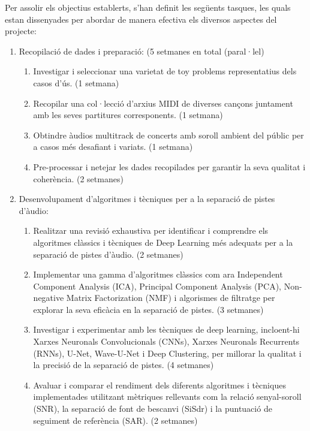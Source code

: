 ﻿\documentclass[10pt,a4paper,twocolumn,twoside]{article}
\begin{document}
Per assolir els objectius establerts, s'han definit les següents tasques, les quals estan dissenyades per abordar de manera efectiva els diversos aspectes del projecte:

\begin{enumerate}
    \item Recopilació de dades i preparació: (5 setmanes en total (paral·lel)
    \begin{enumerate}
        \item Investigar i seleccionar una varietat de toy problems representatius dels casos d'ús. (1 setmana)
        \item Recopilar una col·lecció d'arxius MIDI de diverses cançons juntament amb les seves partitures corresponents. (1 setmana)
        \item Obtindre àudios multitrack de concerts amb soroll ambient del públic per a casos més desafiant i variats. (1 setmana)
        \item Pre-processar i netejar les dades recopilades per garantir la seva qualitat i coherència. (2 setmanes)
    \end{enumerate}
    
    \item Desenvolupament d'algoritmes i tècniques per a la separació de pistes d'àudio:
    \begin{enumerate}
        \item Realitzar una revisió exhaustiva per identificar i comprendre els algoritmes clàssics i tècniques de Deep Learning més adequats per a la separació de pistes d'àudio. (2 setmanes)
        \item Implementar una gamma d'algoritmes clàssics com ara Independent Component Analysis (ICA), Principal Component Analysis (PCA), Non-negative Matrix Factorization (NMF) i algorismes de filtratge per explorar la seva eficàcia en la separació de pistes. (3 setmanes)
        \item Investigar i experimentar amb les tècniques de deep learning, incloent-hi Xarxes Neuronals Convolucionals (CNNs), Xarxes Neuronals Recurrents (RNNs), U-Net, Wave-U-Net i Deep Clustering, per millorar la qualitat i la precisió de la separació de pistes. (4 setmanes)
        \item Avaluar i comparar el rendiment dels diferents algoritmes i tècniques implementades utilitzant mètriques rellevants com la relació senyal-soroll (SNR), la separació de font de bescanvi (SiSdr) i la puntuació de seguiment de referència (SAR). (2 setmanes)
    \end{enumerate}
    

\end{enumerate}
\end{document}
